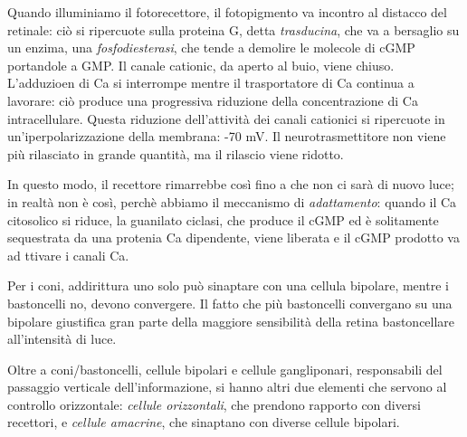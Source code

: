 \documentclass[a4paper,12pt]{article}
\begin{document}
Quando illuminiamo il fotorecettore, il fotopigmento va incontro al distacco del retinale: ciò si ripercuote sulla proteina G, detta \emph{trasducina}, che va a bersaglio su un enzima, una \emph{fosfodiesterasi}, che tende a demolire le molecole di cGMP portandole a GMP. Il canale cationic, da aperto al buio, viene chiuso. L'adduzioen di Ca si interrompe mentre il trasportatore di Ca continua a lavorare: ciò produce una progressiva riduzione della concentrazione di Ca intracellulare. Questa riduzione dell'attività dei canali cationici si ripercuote in un'iperpolarizzazione della membrana: -70 mV. Il neurotrasmettitore non viene più rilasciato in grande quantità, ma il rilascio viene ridotto.

In questo modo, il recettore rimarrebbe così fino a che non ci sarà di nuovo luce; in realtà non è così, perchè abbiamo il meccanismo di \emph{adattamento}: quando il Ca citosolico si riduce, la guanilato ciclasi, che produce il cGMP ed è solitamente sequestrata da una protenia Ca dipendente, viene liberata e il cGMP prodotto va ad ttivare i canali Ca. 

Per i coni, addirittura uno solo può sinaptare con una cellula bipolare, mentre i bastoncelli no, devono convergere. Il fatto che più bastoncelli convergano su una bipolare giustifica gran parte della maggiore sensibilità della retina bastoncellare all'intensità di luce.

Oltre a coni/bastoncelli, cellule bipolari e cellule gangliponari, responsabili del passaggio verticale dell'informazione, si hanno altri due elementi che servono al controllo orizzontale: \emph{cellule orizzontali}, che prendono rapporto con diversi recettori, e \emph{cellule amacrine}, che sinaptano con diverse cellule bipolari. 
\end{document}
